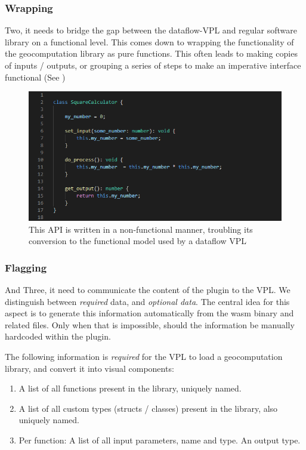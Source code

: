 \subsubsection{Wrapping}

Two, it needs to bridge the gap between the dataflow-VPL and regular software library on a functional level. 
This comes down to wrapping the functionality of the geocomputation library as pure functions. 
This often leads to making copies of inputs / outputs, or grouping a series of steps to make an imperative interface functional (See )

\begin{figure}
  \centering
  \graphicspath{ {../../assets/images/6/3/} }
  \includegraphics[width=\linewidth]{ugly-oop.png}
  \caption[]{This API is written in a non-functional manner, troubling its conversion to the functional model used by a dataflow VPL}
  \label{fig:oop-considered-harmful}
\end{figure}

\subsubsection{Flagging}

And Three, it need to communicate the content of the plugin to the VPL. 
We distinguish between \emph{required} data, and \emph{optional data}.
The central idea for this aspect is to generate this information automatically from the wasm binary and related files.
Only when that is impossible, should the information be manually hardcoded within the plugin.

The following information is \emph{required} for the VPL to load a geocomputation library, and convert it into visual components:

\begin{enumerate}[-]
  \item A list of all functions present in the library, uniquely named.
  \item A list of all custom types (structs / classes) present in the library, also uniquely named.
  \item Per function:  
  \subitem A list of all input parameters, name and type.
  \subitem An output type.
\end{enumerate}

